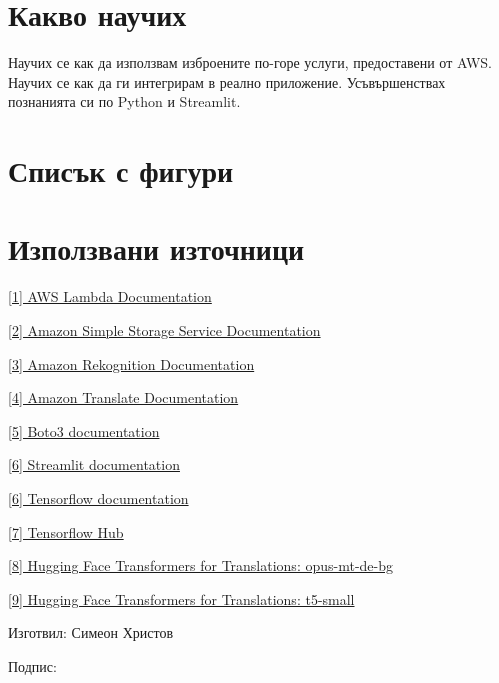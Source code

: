 \documentclass[12pt]{article}
\begin{document}
\section{Какво научих}

Научих се как да използвам изброените по-горе услуги, предоставени от AWS. Научих се как да ги интегрирам в реално приложение. Усъвършенствах познанията си по Python и Streamlit.

\section{Списък с фигури}

\listoffigures

\section{Използвани източници}

\noindent\href{https://docs.aws.amazon.com/lambda/?id=docs_gateway}{[1] AWS Lambda Documentation}
 
\medskip

\noindent\href{https://docs.aws.amazon.com/s3/?id=docs_gateway}{[2] Amazon Simple Storage Service Documentation}
 
\medskip

\noindent\href{https://docs.aws.amazon.com/rekognition/?id=docs_gateway}{[3] Amazon Rekognition Documentation}
 
\medskip

\noindent\href{https://docs.aws.amazon.com/translate/?id=docs_gateway}{[4] Amazon Translate Documentation}
 
\medskip

\noindent\href{https://boto3.amazonaws.com/v1/documentation/api/latest/index.html}{[5] Boto3 documentation}
 
\medskip

\noindent\href{https://docs.streamlit.io/}{[6] Streamlit documentation}
 
\medskip

\noindent\href{https://www.tensorflow.org/}{[6] Tensorflow documentation}
  
\medskip

\noindent\href{https://tfhub.dev/}{[7] Tensorflow Hub}

\medskip

\noindent\href{https://huggingface.co/Helsinki-NLP/opus-mt-de-bg}{[8] Hugging Face Transformers for Translations: opus-mt-de-bg}

\medskip

\noindent\href{https://huggingface.co/t5-small}{[9] Hugging Face Transformers for Translations: t5-small}

\bigskip

Изготвил: Симеон Христов

\bigskip

Подпис: 
\end{document}
